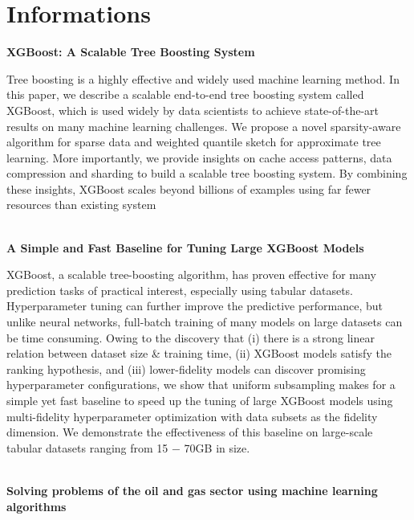 \section{Informations}
\label{sec:Informations}

\textbf{XGBoost: A Scalable Tree Boosting System}

Tree boosting is a highly effective and widely used machine learning method. In this paper, we describe a scalable end-to-end tree boosting system called XGBoost, which is used widely by data scientists to achieve state-of-the-art results on many machine learning challenges. We propose a novel sparsity-aware algorithm for sparse data and weighted quantile sketch for approximate tree learning. More importantly, we provide insights on cache access patterns, data compression and sharding to build a scalable tree boosting system. By combining these insights, XGBoost scales beyond billions of examples using far fewer resources than existing system


\\

\textbf{A Simple and Fast Baseline for Tuning Large XGBoost Models}


XGBoost, a scalable tree-boosting algorithm, has proven effective for many prediction tasks of practical interest, especially using tabular datasets. Hyperparameter tuning can further improve the predictive performance, but unlike neural networks, full-batch training of many models on large datasets can be time consuming. Owing to the discovery that (i) there is a strong linear relation between dataset
size & training time, (ii) XGBoost models satisfy the ranking hypothesis, and (iii) lower-fidelity models can discover promising hyperparameter configurations, we show that uniform subsampling makes for a simple yet fast baseline to speed up the tuning of large XGBoost models using multi-fidelity hyperparameter optimization with data subsets as the fidelity dimension. We demonstrate the effectiveness
of this baseline on large-scale tabular datasets ranging from 15 − 70GB in size.

\\

\textbf{Solving problems of the oil and gas sector using machine learning algorithms}

